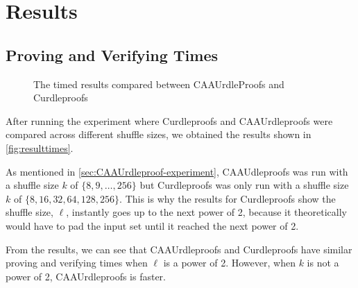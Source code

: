 \section{Results}\label{sec:results}
\subsection{Proving and Verifying Times}\label{subsec:results:provingverifying}

\begin{figure}[!htb]
    \centering
    \qquad
    \caption{The timed results compared between CAAUrdleProofs and Curdleproofs}%
    \label{fig:resulttimes}%
\end{figure}

After running the experiment where Curdleproofs and CAAUrdleproofs were compared across different shuffle sizes, we obtained the results shown in \autoref{fig:resulttimes}.

As mentioned in \autoref{sec:CAAUrdleproof-experiment}, CAAUdleproofs was run with a shuffle size $k$ of $\{8,9,\dots,256\}$ but Curdleproofs was only run with a shuffle size $k$ of $\{8,16,32,64,128,256\}$.
This is why the results for Curdleproofs show the shuffle size, $\ell$, instantly goes up to the next power of 2, because it theoretically would have to pad the input set until it reached the next power of 2.

From the results, we can see that CAAUrdleproofs and Curdleproofs have similar proving and verifying times when $\ell$ is a power of 2.
However, when $k$ is not a power of 2, CAAUrdleproofs is faster.

